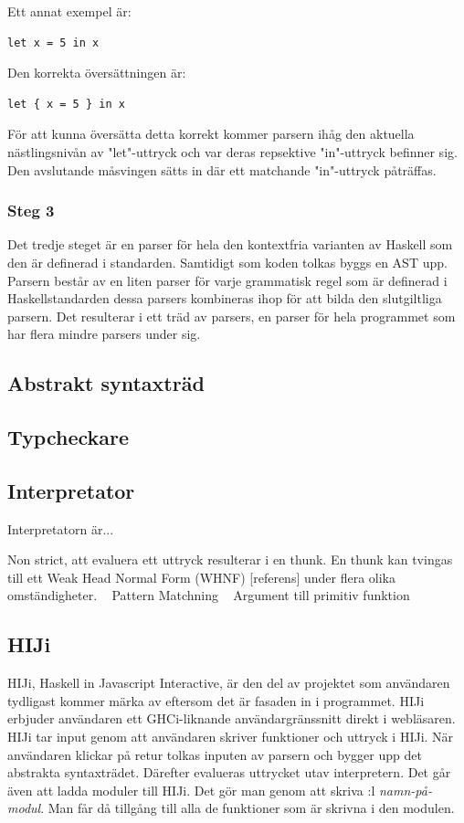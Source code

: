 Ett annat exempel är:
\begin{lstlisting}
let x = 5 in x
\end{lstlisting}
Den korrekta översättningen är:
\begin{lstlisting}
let { x = 5 } in x
\end{lstlisting}
För att kunna översätta detta korrekt kommer parsern ihåg den aktuella nästlingsnivån av "let"-uttryck och var deras repsektive "in"-uttryck befinner sig. 
Den avslutande måsvingen sätts in där ett matchande "in"-uttryck påträffas.

\subsubsection{Steg 3}
Det tredje steget är en parser för hela den kontextfria varianten av Haskell som den är definerad i standarden. 
Samtidigt som koden tolkas byggs en AST upp. Parsern består av en liten parser för varje grammatisk regel som är definerad i Haskellstandarden 
dessa parsers kombineras ihop för att bilda den slutgiltliga parsern. Det resulterar i ett träd av parsers, en parser för hela programmet som har flera mindre parsers under sig.

\subsection{Abstrakt syntaxträd} 

\subsection{Typcheckare} 

\subsection{Interpretator}

Interpretatorn är...

Non strict, att evaluera ett uttryck resulterar i en thunk. En thunk kan tvingas till ett Weak Head Normal Form (WHNF) [referens] under flera olika omständigheter.
~ Pattern Matchning
~ Argument till primitiv funktion



\subsection{HIJi}
HIJi, Haskell in Javascript Interactive, är den del av projektet som användaren tydligast kommer märka av eftersom det är fasaden in i programmet.
HIJi erbjuder användaren ett GHCi-liknande användargränssnitt direkt i webläsaren. 
HIJi tar input genom att användaren skriver funktioner och uttryck i HIJi. När användaren klickar på retur tolkas inputen av parsern och bygger upp det abstrakta syntaxträdet. Därefter evalueras uttrycket utav interpretern.
Det går även att ladda moduler till HIJi. Det gör man genom att skriva :l \emph{namn-på-modul}. Man får då tillgång till alla de funktioner som är skrivna i den modulen. 

